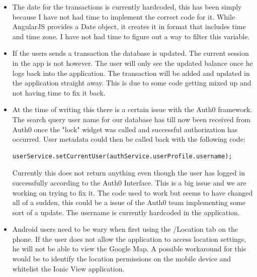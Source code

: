 \begin{itemize}
\begin{center}
    \end{center}
    \item The date for the transactions is currently hardcoded, this has been simply because I have not had time to implement the correct code for it. While AngularJS provides a Date object, it creates it in format that includes time and time zone. I have not had time to figure out a way to filter this variable.
    \item If the users sends a transaction the database is updated. The current session in the app is not however. The user will only see the updated balance once he logs back into the application. The transaction will be added and updated in the application straight away.
    This is due to some code getting mixed up and not having time to fix it back.
    \item At the time of writing this there is a certain issue with the Auth0 framework.
    The search query user name for our database has till now been received from Auth0 once the "lock" widget was called and successful authorization has occurred. User metadata could then be called back with the following code:

\begin{verbatim}
userService.setCurrentUser(authService.userProfile.username);
\end{verbatim}
    Currently this does not return anything even though the user has logged in successfully according to the Auth0 Interface. This is a big issue and we are working on trying to fix it.
    The code used to work but seems to have changed all of a sudden, this could be a issue of the Auth0 team implementing some sort of a update. The username is currently hardcoded in the application.

    \item Android users need to be wary when first using the /Location tab on the phone. If the user does not allow the application to access location settings, he will not be able to view the Google Map. A possible workaround for this would be to identify the location permissions on the mobile device and whitelist the Ionic View application.


\end{itemize}

